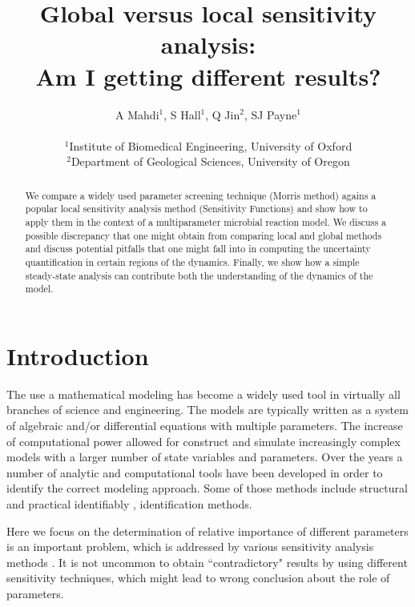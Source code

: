 \documentclass[a4paper, 12pt]{article}
\title{Global versus local sensitivity analysis: \\ Am I getting different results?}
\author{A Mahdi$^1$, S Hall$^1$, Q Jin$^2$, SJ Payne$^1$\\ \\
 {\small \sf $^1$Institute of Biomedical Engineering, University of Oxford}\\
 {\small \sf $^2$Department of Geological Sciences, University of Oregon}
}
\date{}
\begin{document}
\maketitle


\begin{abstract}
We compare a widely used parameter screening technique  (Morris method) agains a popular local sensitivity analysis method (Sensitivity Functions) and show how to apply them in the context of a multiparameter microbial reaction model.  We discuss a possible discrepancy that one might obtain from comparing local and global methods and discuss potential pitfalls that one might fall into in computing the uncertainty quantification in certain regions of the dynamics.  Finally, we show how a simple steady-state analysis can contribute both the understanding of the dynamics of the model.
\end{abstract}

\tableofcontents
 \clearpage

\section{Introduction}

The use a mathematical modeling has become a widely used tool in virtually all branches of science and engineering.  The models are typically written as a system of algebraic and/or differential equations with multiple parameters.  The increase of computational power allowed for construct and simulate increasingly complex models with a larger number of  state variables and parameters.  Over the years a number of analytic and computational tools have been developed in order to identify the correct modeling approach. Some of those methods include structural and practical identifiably \cite{Cobelli1980, Ljung1994, Raue2009, MahMesSul14}, identification \cite{Ljung1998} methods. 

\smallskip

Here we focus on the  determination of relative importance of different parameters is an important problem, which is addressed by various sensitivity analysis methods \cite{Saltelli2000}. It is not uncommon to obtain ``contradictory" results by using different sensitivity techniques, which might lead to wrong conclusion about the role of parameters.

{\color{red}{ADAM: I think that we should define or explain what we mean by local and global here.}}
\end{document}
